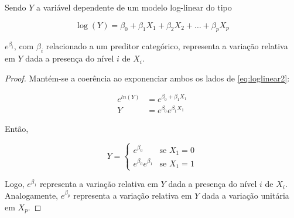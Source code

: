 \begin{apendicesenv}
\begin{proposition}
  \label{proposicao2}

  Sendo $Y$ a variável dependente de um modelo log-linear do tipo
  
  \begin{equation}
    \log(Y) = \beta_0 + \beta_1X_1 + \beta_2X_2 + \ldots + \beta_pX_p
  \end{equation} \label{eq:loglinear2}
  
  \noindent $e^{\beta_i}$, com $\beta_i$ relacionado a um preditor categórico, representa a variação relativa em $Y$ dada a presença do nível $i$ de $X_i$.
\end{proposition}

\begin{proof}
  Mantém-se a coerência ao exponenciar ambos os lados de \eqref{eq:loglinear2}:

  $$
  \begin{aligned}
    e^{ln(Y)} &= e^{\beta_0 + \beta_1X_1} \\
    Y &= e^{\beta_0}e^{\beta_1X_1}
  \end{aligned}
  $$

  Então,

  $$
  Y = 
  \begin{cases}
    e^{\beta_0} & \text{se $X_1=0$} \\
    e^{\beta_0}e^{\beta_1} & \text{se $X_1=1$}
  \end{cases}
  $$

  Logo, $e^{\beta_1}$ representa a variação relativa em $Y$ dada a presença do nível $i$ de $X_i$. Analogamente, $e^{\beta_p}$ representa a variação relativa em $Y$ dada a variação unitária em $X_p$.
\end{proof}
\end{apendicesenv}

%
%
